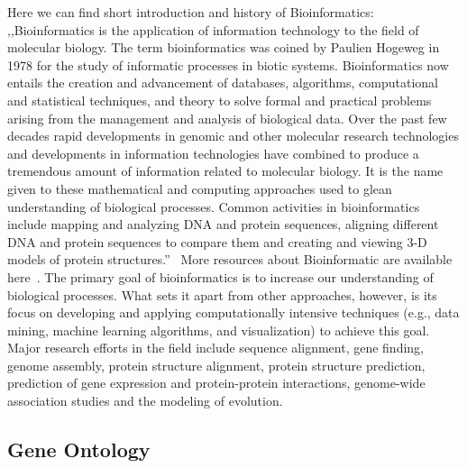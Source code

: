 Here we can find short introduction and history of Bioinformatics: ,,Bioinformatics is the application of information technology to the field of molecular biology. The term bioinformatics was coined by Paulien Hogeweg in 1978 for the study of informatic processes in biotic systems. Bioinformatics now entails the creation and advancement of databases, algorithms, computational and statistical techniques, and theory to solve formal and practical problems arising from the management and analysis of biological data. Over the past few decades rapid developments in genomic and other molecular research technologies and developments in information technologies have combined to produce a tremendous amount of information related to molecular biology. It is the name given to these mathematical and computing approaches used to glean understanding of biological processes. Common activities in bioinformatics include mapping and analyzing DNA and protein sequences, aligning different DNA and protein sequences to compare them and creating and viewing 3-D models of protein structures.''~\cite{Bioinformatic} More resources about Bioinformatic are available here~\cite{Bioinformatic_resources}.
The primary goal of bioinformatics is to increase our understanding of biological processes. What sets it apart from other approaches, however, is its focus on developing and applying computationally intensive techniques (e.g., data mining, machine learning algorithms, and visualization) to achieve this goal. Major research efforts in the field include sequence alignment, gene finding, genome assembly, protein structure alignment, protein structure prediction, prediction of gene expression and protein-protein interactions, genome-wide association studies and the modeling of evolution.

\subsection{Gene Ontology}
\label{sec:gene_ontology}

